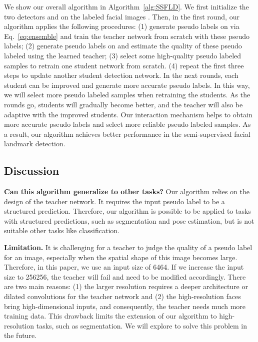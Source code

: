 \documentclass[10pt,twocolumn,letterpaper]{article}
\def\Algref#1{Algorithm~\ref{#1}}
\def\Eqref#1{{Eq.~\eqref{#1}}}
\begin{document}
We show our overall algorithm in \Algref{alg:SSFLD}.
We first initialize the two detectors  and  on the labeled facial images .
Then, in the first round, our algorithm applies the following procedures:
(1) generate pseudo labels on  via \Eqref{eq:ensemble} and train the teacher network from scratch with these pseudo labels;
(2) generate pseudo labels on  and estimate the quality of these pseudo labeled using the learned teacher;
(3) select some high-quality pseudo labeled samples to retrain one student network from scratch.
(4) repeat the first three steps to update another student detection network.
In the next rounds, each student can be improved and generate more accurate pseudo labels. In this way, we will select more pseudo labeled samples when retraining the students.
As the rounds go, students will gradually become better, and the teacher will also be adaptive with the improved students.
Our interaction mechanism helps to obtain more accurate pseudo labels and select more reliable pseudo labeled samples. As a result, our algorithm achieves better performance in the semi-supervised facial landmark detection.




\subsection{Discussion}\label{sec:discussion}


\textbf{Can this algorithm generalize to other tasks?}
Our algorithm relies on the design of the teacher network. It requires the input pseudo label to be a structured prediction.
Therefore, our algorithm is possible to be applied to tasks with structured predictions, such as segmentation and pose estimation, but is not suitable other tasks like classification.


\textbf{Limitation.}
It is challenging for a teacher to judge the quality of a pseudo label for an image, especially when the spatial shape of this image becomes large. Therefore, in this paper, we use an input size of 6464. If we increase the input size to 256256, the teacher will fail and need to be modified accordingly.
There are two main reasons: (1) the larger resolution requires a deeper architecture or dilated convolutions for the teacher network and (2) the high-resolution faces bring high-dimensional inputs, and consequently, the teacher needs much more training data.
This drawback limits the extension of our algorithm to high-resolution tasks, such as segmentation. We will explore to solve this problem in the future. 
\end{document}
